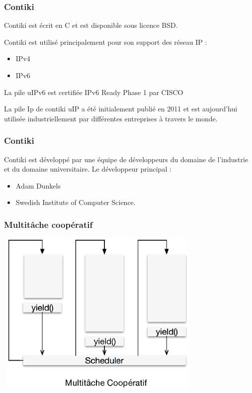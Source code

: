 \documentclass{smilebeamer}
\begin{document}
\begin{frame}
\frametitle{Contiki}

Contiki est écrit en C et est disponible sous licence BSD.

Contiki est utilisé principalement pour son support des réseau IP :
\begin{itemize}
\item IPv4
\item IPv6
\end{itemize}

La pile uIPv6 est certifiée IPv6 Ready Phase 1 par CISCO

La pile Ip de contiki uIP a été initialement publié en 2011 et est aujourd'hui utilisée industriellement par différentes entreprises à travers le monde.

\end{frame}


\begin{frame}
\frametitle{Contiki}
Contiki est développé par une équipe de développeurs du domaine de l'industrie et du domaine universitaire. 
Le développeur principal :
\begin{itemize}
\item Adam Dunkels
\item Swedish Institute of Computer Science.
\end{itemize}
\end{frame}


\begin{frame}
\frametitle{Multitâche coopératif}
\includegraphics[width=10cm,height=8cm]{img/multitache_coop.eps}
\end{frame}
\end{document}
